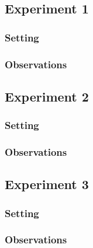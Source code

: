 \documentclass[11pt]{article}
\begin{document}
\subsection{Experiment 1}

\subsubsection{Setting}

\subsubsection{Observations}

\subsection{Experiment 2}

\subsubsection{Setting}

\subsubsection{Observations}

\subsection{Experiment 3}
\label{sec:experiment3}

\subsubsection{Setting}

\subsubsection{Observations}
\end{document}
